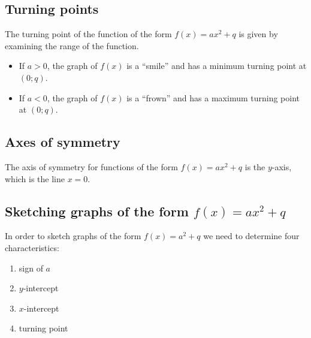 \subsection*{Turning points}

The turning point of the function of the form $f(x)=ax^{2}+q$ is given by examining the range of the function. 
\begin{itemize}
 \item If $a>0$, the graph of $f(x)$ is a ``smile'' and has a minimum turning point at $(0;q)$.
\item If $a<0$, the graph of $f(x)$ is a ``frown'' and has a maximum turning point at $(0;q)$.
\end{itemize}


\subsection*{Axes of symmetry}

The axis of symmetry for functions of the form $f(x)=ax^{2}+q$ is the $y$-axis, which is the line $x=0$. 

\subsection*{Sketching graphs of the form $f(x)=ax^{2}+q$}

In order to sketch graphs of the form $f(x)=a^{2}+q$ we need to determine four characteristics:
\begin{enumerate}[noitemsep, label=\textbf{\arabic*}. ] 
\item sign of $a$
\item $y$-intercept
\item $x$-intercept
\item turning point

\end{enumerate}

